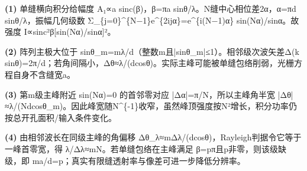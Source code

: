 \par\noindent\textbf{(1)} 单缝横向积分给幅度 A₁∝a sinc(β)，β=πa sinθ/λ。N缝中心相位差2α，α=πd sinθ/λ，振幅几何级数 Σ\_\{j=0\}\textasciicircum{}\{N−1\}e\textasciicircum{}\{2ijα\}=e\textasciicircum{}\{i(N−1)α\} sin(Nα)/sinα。故强度 I∝sinc²β[sin(Nα)/sinα]²。
\par\noindent\textbf{(2)} 阵列主极大位于 sinθ\_m=mλ/d（整数m且|sinθ\_m|≤1）。相邻级次波矢差Δ(k sinθ)=2π/d；若角间隔小，Δθ≈λ/(dcosθ)。实际主峰可能被单缝包络削弱，光栅方程自身不含缝宽a。
\par\noindent\textbf{(3)} 第m级主峰附近 sin(Nα)=0 的首邻零对应 |Δα|=π/N，所以主峰角半宽 |Δθ|≈λ/(Ndcosθ\_m)。因此峰宽随N\textasciicircum{}\{-1\}收窄，虽然峰顶强度按N²增长，积分功率仍按总开孔面积/输入条件变化。
\par\noindent\textbf{(4)} 由相邻波长在同级主峰的角偏移 Δθ\_λ≈mΔλ/(dcosθ)，Rayleigh判据令它等于一峰首零宽，得 λ/Δλ≈mN。若单缝包络在主峰满足 β=pπ且p非零，则该级缺级，即 ma/d=p；真实有限缝透射率与像差可进一步降低分辨率。
